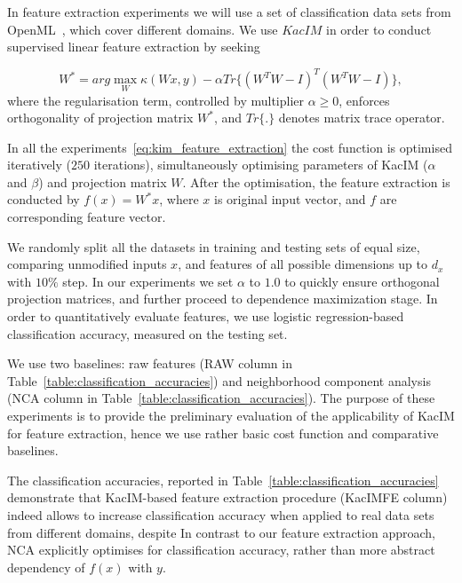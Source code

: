 \documentclass{article}
\begin{document}
In feature extraction experiments we will use a set of classification data sets from OpenML~\cite{OpenML2013}, which cover different domains.  We use $KacIM$ in order to conduct supervised linear feature extraction by seeking 

\begin{equation}
\label{eq:kim_feature_extraction}    
W^{*} = arg \max_{W} \kappa(Wx, y) - \alpha Tr\{(W^{T}W-I)^{T}(W^{T}W-I) \},
\end{equation}
where the regularisation term, controlled by multiplier $\alpha \geq 0$, enforces orthogonality of projection matrix $W^{*}$, and $Tr\{.\}$ denotes matrix trace operator.


In all the experiments~\eqref{eq:kim_feature_extraction} the cost function is optimised iteratively ($250$ iterations), simultaneously optimising parameters of KacIM ($\alpha$ and $\beta$) and projection matrix $W$.
After the optimisation, the feature extraction is conducted by $f(x) = W^{*}x$, where $x$ is original input vector, and $f$ are corresponding feature vector. 



We randomly split all the datasets in training and testing sets of equal size, comparing unmodified inputs $x$, and features of all possible dimensions up to $d_{x}$ with $10\%$ step.  In our experiments we set $\alpha$ to $1.0$ to quickly ensure orthogonal projection matrices, and further proceed to dependence maximization stage. In order to quantitatively evaluate features, we use logistic regression-based classification accuracy, measured on the testing set.


We use two baselines: raw features (RAW column in Table~\ref{table:classification_accuracies}) and neighborhood component analysis~\cite{NIPS2004_42fe8808} (NCA column in Table~\ref{table:classification_accuracies}).  The purpose of these experiments is to provide the preliminary evaluation of the applicability of KacIM for feature extraction, hence we use rather basic cost function and comparative baselines.




The classification accuracies, reported in Table~\ref{table:classification_accuracies} demonstrate that KacIM-based feature extraction procedure (KacIMFE column) indeed allows to increase classification accuracy when applied to real data sets from different domains, despite In contrast to our feature extraction approach, NCA explicitly optimises for classification accuracy, rather than more abstract dependency of $f(x)$ with $y$.
\end{document}
